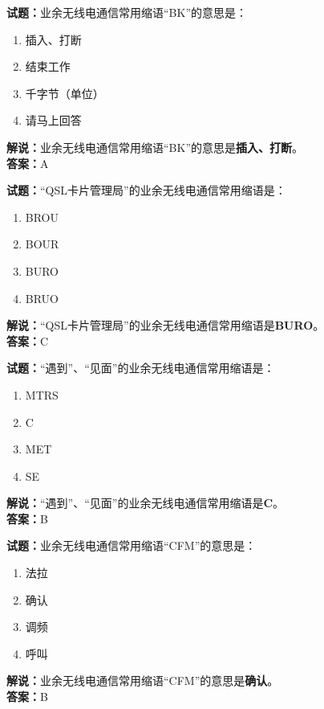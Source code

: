 \documentclass{ctexbook}
\begin{document}
\bigskip


\noindent\textbf{试题：}业余无线电通信常用缩语“BK”的意思是：
\begin{enumerate}[leftmargin=3em]
\item 插入、打断
\item 结束工作
\item 千字节（单位）
\item 请马上回答
\end{enumerate}
\noindent\textbf{解说：}业余无线电通信常用缩语“BK”的意思是\textbf{插入、打断}。\\\noindent\textbf{答案：}A

\bigskip


\noindent\textbf{试题：}“QSL卡片管理局”的业余无线电通信常用缩语是：
\begin{enumerate}[leftmargin=3em]
\item BROU
\item BOUR
\item BURO
\item BRUO
\end{enumerate}
\noindent\textbf{解说：}“QSL卡片管理局”的业余无线电通信常用缩语是\textbf{BURO}。\\\noindent\textbf{答案：}C

\bigskip


\noindent\textbf{试题：}“遇到”、“见面”的业余无线电通信常用缩语是：
\begin{enumerate}[leftmargin=3em]
\item MTRS
\item C
\item MET
\item SE
\end{enumerate}
\noindent\textbf{解说：}“遇到”、“见面”的业余无线电通信常用缩语是\textbf{C}。\\\noindent\textbf{答案：}B


\bigskip


\noindent\textbf{试题：}业余无线电通信常用缩语“CFM”的意思是：
\begin{enumerate}[leftmargin=3em]
\item 法拉
\item 确认
\item 调频
\item 呼叫
\end{enumerate}
\noindent\textbf{解说：}业余无线电通信常用缩语“CFM”的意思是\textbf{确认}。\\\noindent\textbf{答案：}B

\bigskip
\end{document}
